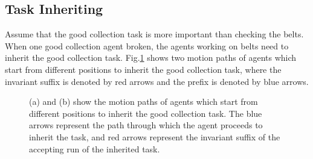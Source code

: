 \documentclass[journal]{IEEEtran}
\begin{document}
\subsection{Task Inheriting}
Assume that the good collection task is more important than checking the belts. When one good collection agent broken, the agents working on belts need to inherit the good collection task. Fig.\ref{third} shows two motion paths of agents which start from different positions to inherit the good collection task, where the invariant suffix is denoted by red arrows and the prefix is denoted by blue arrows.
\begin{figure}
\centering
{}
\hspace{0.3in}
\caption{(a) and (b) show the motion paths of agents which start from different positions to inherit the good collection task. The blue arrows represent the path through which the agent proceeds to inherit the task, and red arrows represent the invariant suffix of the accepting run of the inherited task. }
\label{third}
\end{figure}

\end{document}
